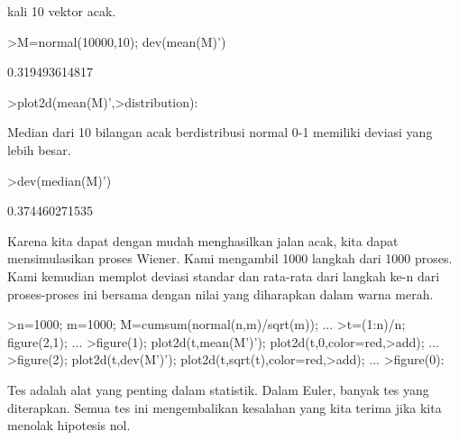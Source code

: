 \documentclass{article}
\begin{document}
\begin{eulernotebook}
\begin{eulercomment}
kali 10 vektor acak.
\end{eulercomment}
\begin{eulerprompt}
>M=normal(10000,10); dev(mean(M)')
\end{eulerprompt}
\begin{euleroutput}
  0.319493614817
\end{euleroutput}
\begin{eulerprompt}
>plot2d(mean(M)',>distribution):
\end{eulerprompt}
\begin{eulercomment}
Median dari 10 bilangan acak berdistribusi normal 0-1 memiliki deviasi
yang lebih besar.
\end{eulercomment}
\begin{eulerprompt}
>dev(median(M)')
\end{eulerprompt}
\begin{euleroutput}
  0.374460271535
\end{euleroutput}
\begin{eulercomment}
Karena kita dapat dengan mudah menghasilkan jalan acak, kita dapat
mensimulasikan proses Wiener. Kami mengambil 1000 langkah dari 1000
proses. Kami kemudian memplot deviasi standar dan rata-rata dari
langkah ke-n dari proses-proses ini bersama dengan nilai yang
diharapkan dalam warna merah.
\end{eulercomment}
\begin{eulerprompt}
>n=1000; m=1000; M=cumsum(normal(n,m)/sqrt(m)); ...
>t=(1:n)/n; figure(2,1); ...
>figure(1); plot2d(t,mean(M')'); plot2d(t,0,color=red,>add); ...
>figure(2); plot2d(t,dev(M')'); plot2d(t,sqrt(t),color=red,>add); ...
>figure(0):
\end{eulerprompt}
\begin{eulercomment}
Tes adalah alat yang penting dalam statistik. Dalam Euler, banyak tes
yang diterapkan. Semua tes ini mengembalikan kesalahan yang kita
terima jika kita menolak hipotesis nol.


\end{eulercomment}
\end{eulernotebook}
\end{document}
